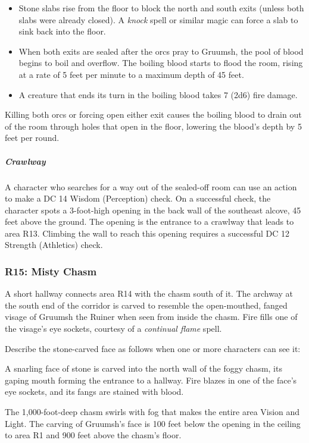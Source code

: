 \documentclass[10pt,a4paper,twoside,bg=print,twocolumn,openany,nodeprecatedcode]{dndbook}
\begin{document}
\begin{itemize}
\item Stone slabs rise from the floor to block the north and south exits (unless both slabs were already closed). A \textit{knock} spell or similar magic can force a slab to sink back into the floor.
\item When both exits are sealed after the orcs pray to Gruumsh, the pool of blood begins to boil and overflow. The boiling blood starts to flood the room, rising at a rate of 5 feet per minute to a maximum depth of 45 feet.
\item A creature that ends its turn in the boiling blood takes 7 (2d6) fire damage.
\end{itemize}

Killing both orcs or forcing open either exit causes the boiling blood to drain out of the room through holes that open in the floor, lowering the blood's depth by 5 feet per round.

\subparagraph{Crawlway}
A character who searches for a way out of the sealed-off room can use an action to make a DC 14 Wisdom (Perception) check. On a successful check, the character spots a 3-foot-high opening in the back wall of the southeast alcove, 45 feet above the ground. The opening is the entrance to a crawlway that leads to area R13. Climbing the wall to reach this opening requires a successful DC 12 Strength (Athletics) check.

\subsubsection{R15: Misty Chasm}
A short hallway connects area R14 with the chasm south of it. The archway at the south end of the corridor is carved to resemble the open-mouthed, fanged visage of Gruumsh the Ruiner when seen from inside the chasm. Fire fills one of the visage's eye sockets, courtesy of a \textit{continual flame} spell.

Describe the stone-carved face as follows when one or more characters can see it:

\begin{DndReadAloud}{}
A snarling face of stone is carved into the north wall of the foggy chasm, its gaping mouth forming the entrance to a hallway. Fire blazes in one of the face's eye sockets, and its fangs are stained with blood.

\end{DndReadAloud}

The 1,000-foot-deep chasm swirls with fog that makes the entire area Vision and Light. The carving of Gruumsh's face is 100 feet below the opening in the ceiling to area R1 and 900 feet above the chasm's floor.
\end{document}
